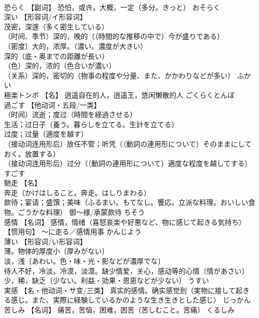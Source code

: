\documentclass[8pt]{extreport}
\begin{document}
\begin{CJK}{UTF8}{min}
\\	恐らく	【副词】 恐怕，或许，大概，一定（多分。きっと）	おそらく	
\\	深い	【形容词/イ形容词】 
\\	茂密，深邃（多く密生している） 
\\	（时间、季节）深的，晚的（（時間的な推移の中で）今が盛りである） 
\\	（密度）大的，浓厚。（濃い。濃度が大きい） 
\\	深的（底・奥までの距離が長い） 
\\	（色）深的，浓的（色合いが濃い） 
\\	（关系）深的，密切的（物事の程度や分量、また、かかわりなどが多い）	ふかい	
\\	極楽トンボ	【名】 逍遥自在的人，逍遥王，悠闲懒散的人	ごくらくとんぼ	
\\	過ごす	【他动词・五段/一类】 
\\	（时间）流逝；度过（時間を経過させる） 
\\	生活；过日子（養う。暮らしを立てる。生計を立てる） 
\\	过度；过量（適度を越す） 
\\	（接动词连用形后）放任不管；听凭（（動詞の連用形について）そのままにしておく。放置する） 
\\	（接动词连用形后）过分（（動詞の連用形について）適度な程度を越してする）	すごす	
\\	馳走	【名】 
\\	奔走（かけはしること。奔走。はしりまわる） 
\\	款待；宴请；盛馔；美味（ふるまい。もてなし。饗応。立派な料理。おいしい食物。ごうかな料理） 御～様/承蒙款待	ちそう	
\\	感情	【名词】 感情，情绪（喜怒哀楽や好悪など、物に感じて起きる気持ち） 【惯用句】 〜に走る／感情用事	かんじよう	
\\	薄い	【形容词/い形容词】 
\\	薄。物体的厚度小〔厚みがない〕 
\\	淡，浅〔あわい。色・味・光・影などが濃厚でな〕 
\\	待人不好，冷淡。冷漠，淡漠。缺少情爱，关心，感动等的心情〔情があさい〕 
\\	少，稀，缺乏〔少ない。利益・効果・恩恵などが少ない〕	うすい	
\\	実感	【名・他动词・サ变/三类】 真实的感情。确实感觉到（実物に接して起きる感じ。また、実際に経験しているかのような生き生きとした感じ）	じっかん	
\\	苦しみ	【名词】 痛苦，苦恼，困难，困苦（苦しむこと。苦痛）	くるしみ	

\end{CJK}
\end{document}
